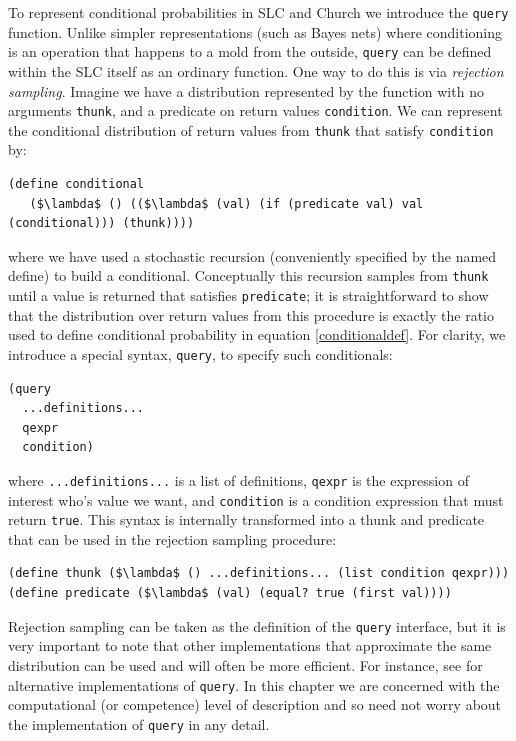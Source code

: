 \documentclass[12pt]{article}
\begin{document}
To represent conditional probabilities in SLC and Church we introduce the \lstinline{query} function. Unlike simpler representations (such as Bayes nets) where conditioning is an operation that happens to a mold from the outside, \lstinline{query} can be defined within the SLC itself as an ordinary function. One way to do this is via \emph{rejection sampling}. Imagine we have a distribution represented by the function with no arguments \lstinline{thunk}, and a predicate on return values \lstinline{condition}. We can represent the conditional distribution of return values from \lstinline{thunk} that satisfy \lstinline{condition} by:
\begin{lstlisting}[mathescape]
(define conditional 
   ($\lambda$ () (($\lambda$ (val) (if (predicate val) val (conditional))) (thunk))))
\end{lstlisting}
where we have used a stochastic recursion (conveniently specified by the named define) to build a conditional. 
Conceptually this recursion samples from \lstinline{thunk} until a value is returned that satisfies \lstinline{predicate}; it is straightforward to show that the distribution over return values from this procedure is exactly the ratio used to define conditional probability in equation \ref{conditionaldef}.
For clarity, we introduce a special syntax, \lstinline{query}, to specify such conditionals: 
\begin{lstlisting}[mathescape]
(query
  ...definitions...
  qexpr
  condition)
\end{lstlisting}
where \lstinline{...definitions...} is a list of definitions, \lstinline{qexpr} is the expression of interest who's value we want, and \lstinline{condition} is a condition expression that must return \lstinline{true}. 
This syntax is internally transformed into a thunk and predicate that can be used in the rejection sampling procedure:
\begin{lstlisting}[mathescape]
(define thunk ($\lambda$ () ...definitions... (list condition qexpr)))
(define predicate ($\lambda$ (val) (equal? true (first val))))
\end{lstlisting}
Rejection sampling can be taken as the definition of the \lstinline{query} interface, but it is very important to note that other implementations that approximate the same distribution can be used and will often be more efficient. For instance, see \cite{wingate,etc} for alternative implementations of \lstinline{query}. In this chapter we are concerned with the computational (or competence) level of description and so need not worry about the implementation of \lstinline{query} in any detail.
\end{document}
